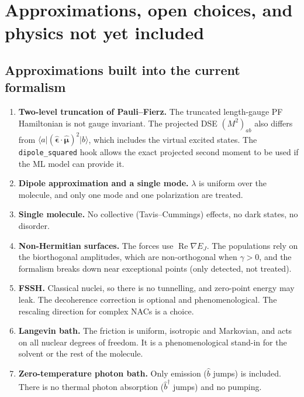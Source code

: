 \documentclass[11pt]{article}
\newcommand{\ket}[1]{\lvert #1 \rangle}
\newcommand{\bra}[1]{\langle #1 \rvert}
\newcommand{\grad}{\nabla}
\newcommand{\bdag}{\hat b^{\dagger}}
\newcommand{\bop}{\hat b}
\newcommand{\eps}{\hat{\bm{\epsilon}}}
\newcommand{\mub}{\bm{\mu}}
\newcommand{\Rep}{\operatorname{Re}}
\newcommand{\code}[1]{\texttt{#1}}
\begin{document}
\section{Approximations, open choices, and physics not yet included}
\subsection{Approximations built into the current formalism}
\begin{enumerate}
\item \textbf{Two-level truncation of Pauli--Fierz.} The truncated length-gauge PF Hamiltonian is not gauge invariant. The projected DSE $(M^2)_{ab}$ also differs from $\bra a(\eps\cdot\hat{\mub})^2\ket b$, which includes the virtual excited states. The \code{dipole\_squared} hook allows the exact projected second moment to be used if the ML model can provide it.
\item \textbf{Dipole approximation and a single mode.} $\lambda$ is uniform over the molecule, and only one mode and one polarization are treated.
\item \textbf{Single molecule.} No collective (Tavis--Cummings) effects, no dark states, no disorder.
\item \textbf{Non-Hermitian surfaces.} The forces use $\Rep\grad E_J$. The populations rely on the biorthogonal amplitudes, which are non-orthogonal when $\gamma>0$, and the formalism breaks down near exceptional points (only detected, not treated).
\item \textbf{FSSH.} Classical nuclei, so there is no tunnelling, and zero-point energy may leak. The decoherence correction is optional and phenomenological. The rescaling direction for complex NACs is a choice.
\item \textbf{Langevin bath.} The friction is uniform, isotropic and Markovian, and acts on all nuclear degrees of freedom. It is a phenomenological stand-in for the solvent or the rest of the molecule.
\item \textbf{Zero-temperature photon bath.} Only emission ($\bop$ jumps) is included. There is no thermal photon absorption ($\bdag$ jumps) and no pumping.
\end{enumerate}
\end{document}
